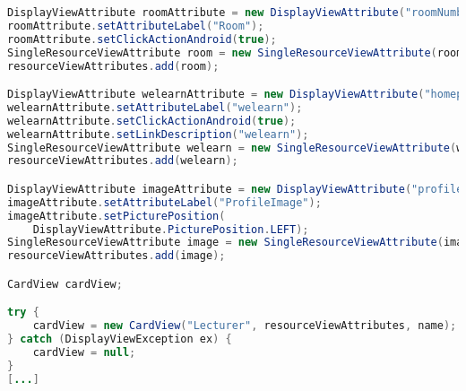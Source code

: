 \begin{lstlisting}[label=lst:cardview_impl,
language=java,
firstnumber=1,
caption=Erstellung einer \textit{CardView}.]
DisplayViewAttribute roomAttribute = new DisplayViewAttribute("roomNumber", ViewAttribute.AttributeType.HOME);
roomAttribute.setAttributeLabel("Room");
roomAttribute.setClickActionAndroid(true);
SingleResourceViewAttribute room = new SingleResourceViewAttribute(roomAttribute);
resourceViewAttributes.add(room);

DisplayViewAttribute welearnAttribute = new DisplayViewAttribute("homepage", ViewAttribute.AttributeType.URL);
welearnAttribute.setAttributeLabel("welearn");
welearnAttribute.setClickActionAndroid(true);
welearnAttribute.setLinkDescription("welearn");
SingleResourceViewAttribute welearn = new SingleResourceViewAttribute(welearnAttribute);
resourceViewAttributes.add(welearn);

DisplayViewAttribute imageAttribute = new DisplayViewAttribute("profileImageUrl", ViewAttribute.AttributeType.PICTURE);
imageAttribute.setAttributeLabel("ProfileImage");
imageAttribute.setPicturePosition(
	DisplayViewAttribute.PicturePosition.LEFT);
SingleResourceViewAttribute image = new SingleResourceViewAttribute(imageAttribute);
resourceViewAttributes.add(image);

CardView cardView;

try {
	cardView = new CardView("Lecturer", resourceViewAttributes, name);
} catch (DisplayViewException ex) {
	cardView = null;
}
[...]
\end{lstlisting}